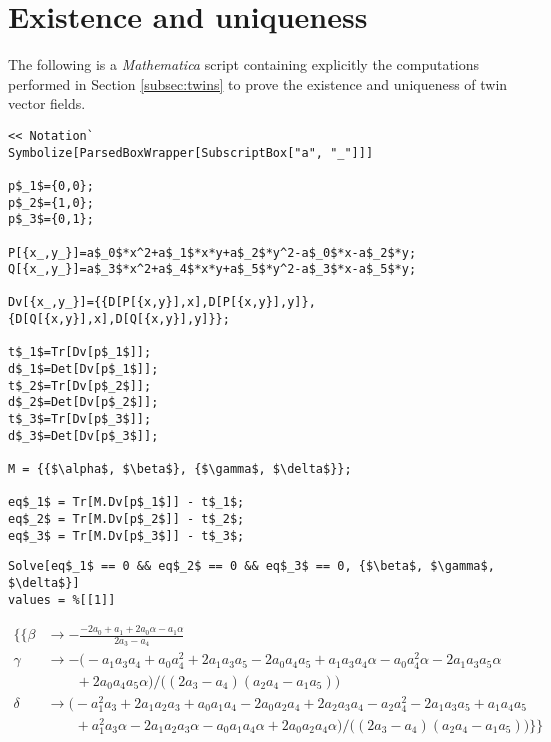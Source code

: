 \lstset{language=Mathematica,mathescape}

\section{Existence and uniqueness}

The following is a \textit{Mathematica} script containing explicitly the computations performed in Section \ref{subsec:twins} to prove the existence and uniqueness of twin vector fields.

\bigskip
\bigskip

\begin{lstlisting}
<< Notation`
Symbolize[ParsedBoxWrapper[SubscriptBox["a", "_"]]]

p$_1$={0,0};
p$_2$={1,0};
p$_3$={0,1};

P[{x_,y_}]=a$_0$*x^2+a$_1$*x*y+a$_2$*y^2-a$_0$*x-a$_2$*y;
Q[{x_,y_}]=a$_3$*x^2+a$_4$*x*y+a$_5$*y^2-a$_3$*x-a$_5$*y;

Dv[{x_,y_}]={{D[P[{x,y}],x],D[P[{x,y}],y]},{D[Q[{x,y}],x],D[Q[{x,y}],y]}};

t$_1$=Tr[Dv[p$_1$]];
d$_1$=Det[Dv[p$_1$]];
t$_2$=Tr[Dv[p$_2$]];
d$_2$=Det[Dv[p$_2$]];
t$_3$=Tr[Dv[p$_3$]];
d$_3$=Det[Dv[p$_3$]];

M = {{$\alpha$, $\beta$}, {$\gamma$, $\delta$}};

eq$_1$ = Tr[M.Dv[p$_1$]] - t$_1$;
eq$_2$ = Tr[M.Dv[p$_2$]] - t$_2$;
eq$_3$ = Tr[M.Dv[p$_3$]] - t$_3$;
\end{lstlisting}

\noindent\makebox[\linewidth]{\rule{\textwidth}{0.4pt}}
\begin{lstlisting}
Solve[eq$_1$ == 0 && eq$_2$ == 0 && eq$_3$ == 0, {$\beta$, $\gamma$, $\delta$}]
values = %[[1]]
\end{lstlisting}
\begin{small}
 \begin{align*}
  \big\{\big\{ \beta &\to -\frac{-2a_0+a_1+2a_0\alpha-a_1\alpha}{2a_3-a_4} \\
  \gamma &\to - \big(-a_1 a_3 a_4+a_0 a_4^2+2 a_1 a_3 a_5-2 a_0 a_4 a_5+a_1 a_3 a_4 \alpha-a_0 a_4^2 \alpha-2 a_1 a_3 a_5 \alpha \\
  &\phantom{\gamma\to} +2 a_0 a_4 a_5 \alpha\big) / \big((2a_3-a_4)(a_2a_4-a_1a_5)\big) \\
  \delta &\to \big(-a_1^2 a_3+2 a_1 a_2 a_3+a_0 a_1 a_4-2 a_0 a_2 a_4+2 a_2 a_3 a_4-a_2 a_4^2-2 a_1 a_3 a_5+a_1 a_4 a_5 \\
  &\phantom{\delta\to} +a_1^2 a_3 \alpha-2 a_1 a_2 a_3 \alpha-a_0 a_1 a_4 \alpha+2 a_0 a_2 a_4 \alpha\big) / \big((2a_3-a_4)(a_2a_4-a_1a_5)\big) \big\}\big\}
 \end{align*}
\end{small}
\noindent\makebox[\linewidth]{\rule{\textwidth}{0.4pt}}

